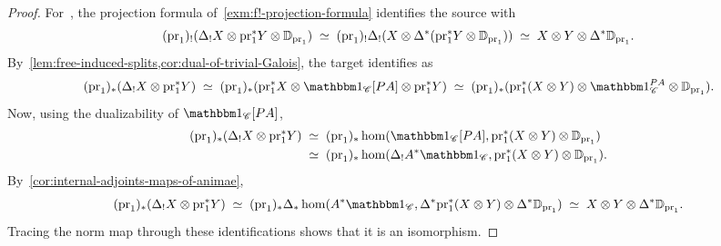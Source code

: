 \documentclass[english,svgnames,table]{article}
\begin{document}
    \begin{proof}
        For~, the projection formula of~\cref{exm:f!-projection-formula} identifies the source with
        \begin{equation*}
            (\mathrm{pr}_1)_! (\Delta_! X \otimes \mathrm{pr}_1^* Y \otimes \mathbb{D}_{\mathrm{pr}_1}) 
            \;\simeq\; (\mathrm{pr}_1)_! \Delta_!(X \otimes \Delta^* (\mathrm{pr}_1^* Y \otimes \mathbb{D}_{\mathrm{pr}_1})) 
            \;\simeq\; X \otimes Y \otimes \Delta^* \mathbb{D}_{\mathrm{pr}_1}.
        \end{equation*}
        By~\cref{lem:free-induced-splits,cor:dual-of-trivial-Galois}, the target identifies as
        \begin{equation*}
            (\pr_1)_* (\Delta_! X \otimes \pr_1^* Y)
            \;\simeq\; (\pr_1)_* (\pr_1^* X \otimes \ounit_{\cC}[\Path A] \otimes \pr_1^* Y) 
            \;\simeq\; (\pr_1)_* (\pr_1^* (X \otimes Y)  \otimes \ounit_{\cC}^{\Path A} \otimes \DD_{\pr_1}).
        \end{equation*}
        Now, using the dualizability of $\ounit_{\cC}[\Path A]$,
        \begin{equation*}
            \begin{split}
                (\pr_1)_* (\Delta_! X \otimes \pr_1^* Y) 
                & \;\simeq\; (\pr_1)_* \hom(\ounit_{\cC}[\Path A], \pr_1^* (X \otimes Y) \otimes \DD_{\pr_1}) \\
                & \;\simeq\; (\pr_1)_* \hom(\Delta_! A^* \ounit_{\cC}, \pr_1^* (X \otimes Y) \otimes \DD_{\pr_1}).
            \end{split}
        \end{equation*}        
        By~\cref{cor:internal-adjoints-maps-of-animae},
        \begin{equation*}
            (\pr_1)_* (\Delta_! X \otimes \pr_1^* Y) 
            \;\simeq\; (\pr_1)_* \Delta_* \hom(A^* \ounit_{\cC}, \Delta^* \pr_1^* (X \otimes Y) \otimes \Delta^* \DD_{\pr_1}) 
            \;\simeq\; X \otimes Y \otimes \Delta^* \DD_{\pr_1}.
        \end{equation*}
        Tracing the norm map through these identifications shows that it is an isomorphism.


\end{proof}
\end{document}

